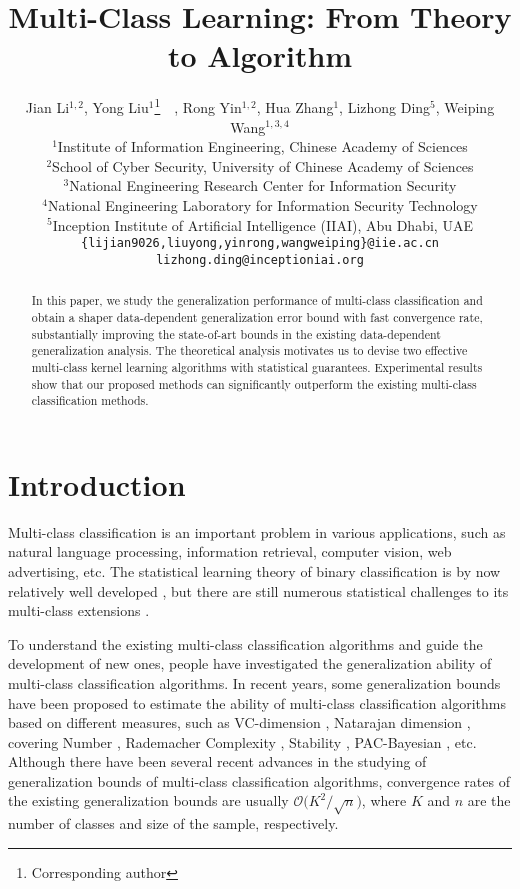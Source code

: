 \documentclass{article}
\title{Multi-Class Learning: From Theory to Algorithm}
\author{
Jian Li$^{1,2}$, Yong Liu$^1$\thanks{Corresponding author}~~,  Rong Yin$^{1,2}$, Hua Zhang$^{1}$, Lizhong Ding$^5$, Weiping Wang$^{1,3,4}$\\
$ ^1$Institute of Information Engineering, Chinese Academy of Sciences\\
$ ^2$School of Cyber Security, University of Chinese Academy of Sciences\\
$ ^3$National Engineering Research Center for Information Security\\
$ ^4$National Engineering Laboratory for Information Security Technology\\
$ ^5$Inception Institute of Artificial Intelligence (IIAI), Abu Dhabi, UAE\\
\texttt{\{lijian9026,liuyong,yinrong,wangweiping\}@iie.ac.cn}\\
\texttt{lizhong.ding@inceptioniai.org}
}
\begin{document}

\maketitle

\begin{abstract}
In this paper, we study the generalization performance of multi-class classification and obtain a shaper data-dependent generalization error bound with fast convergence rate, substantially improving the state-of-art bounds in the existing data-dependent generalization analysis. The theoretical analysis motivates us to devise two effective multi-class kernel learning algorithms with statistical guarantees. Experimental results show that our proposed methods can significantly outperform the existing multi-class classification methods.
\end{abstract}
\section{Introduction}
\label{submission}
Multi-class classification is an important problem in various applications,
such as natural language processing, information retrieval, computer vision,
web advertising, etc.
The statistical learning theory of binary classification is by now relatively well developed \cite{Liu2013epks,Liu2014eacvkmbif,Liu2014pcvks,Liu2011learningkernels,mohri2012foundations,vapnik1998naturestatistical},
but there are still numerous statistical challenges to its multi-class extensions \cite{maximov2016tight}.

To understand the existing multi-class classification algorithms and guide the development of new ones,
people have investigated the generalization ability of multi-class classification algorithms.
In recent years, some generalization bounds have been proposed to
estimate the ability of multi-class classification algorithms based on different measures,
such as
VC-dimension \cite{allwein2000reducing},
Natarajan dimension \cite{daniely2014optimal},
covering Number \cite{guermeur2002combining,Hill2007,zhang2004statistical},
Rademacher Complexity \cite{cortes2013multi,koltchinskii2002empirical,mohri2012foundations},
Stability \cite{Hardt2016}, PAC-Bayesian \cite{McAllester2013}, etc.
Although there have been several recent advances in the studying of
generalization bounds of multi-class classification algorithms,
convergence rates of the existing generalization bounds are usually %
 $\mathcal{O}\big({K^2}/{\sqrt{n}}\big)$,
where $K$ and $n$ are the number of classes and size of the sample, respectively.
\end{document}
